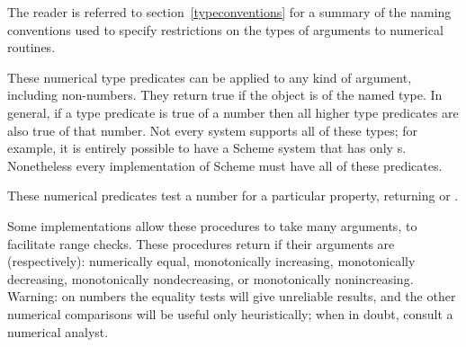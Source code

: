 The reader is referred to section~\ref{typeconventions} for a summary of
the naming conventions used to specify restrictions on the types of
arguments to numerical routines.


\begin{entry}{%
}

These numerical type predicates can be applied to any kind of argument,
including non-numbers.
They return true if the object is of the named type.  In general, if a type
predicate is true of a number then all higher type predicates are also true
of that number.  Not every system supports all of these types; for example,
it is entirely possible to have a Scheme system that has only
s.  Nonetheless every implementation of Scheme must have all
of these predicates.

\end{entry}


\begin{entry}{%
}

These numerical predicates test a number for a particular property, returning
\schtrue{} or \schfalse.

\end{entry}


\begin{entry}{%
}

Some implementations allow these procedures to take many arguments, to
facilitate range checks.  These procedures return \schtrue{} if their
arguments are (respectively): numerically equal, monotonically
increasing, monotonically decreasing, monotonically nondecreasing, or
monotonically nonincreasing.  Warning: on  numbers the
equality tests will give unreliable results, and the other numerical
comparisons will be useful only heuristically; when in doubt, consult a
numerical analyst.

\end{entry}


